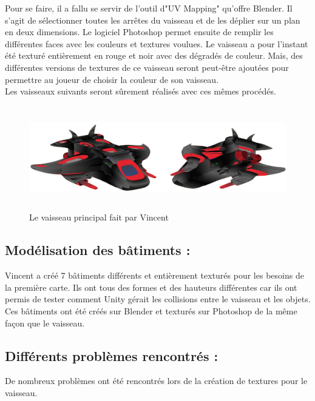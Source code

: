 \documentclass[10pt, titlepage]{report}
\begin{document}
Pour se faire, il a fallu se servir de l'outil d"UV Mapping" qu'offre Blender. Il s'agit de sélectionner toutes les arrêtes du vaisseau et de les déplier sur un plan en deux dimensions. Le logiciel Photoshop permet ensuite de remplir les différentes faces avec les couleurs et textures voulues. Le vaisseau a pour l'instant été texturé entièrement en rouge et noir avec des dégradés de couleur. Mais, des différentes versions de textures de ce vaisseau seront peut-être ajoutées pour permettre au joueur de choisir la couleur de son vaisseau.\\

Les vaisseaux suivants seront sûrement réalisés avec ces mêmes procédés.

\begin{figure}
\center
\includegraphics[height=4.5cm, width=15cm]{vaisseau_vincent.jpg}
\caption{Le vaisseau principal fait par Vincent}
\end{figure}
  
\subsection{Modélisation des bâtiments :}

Vincent a créé 7 bâtiments différents et entièrement texturés pour les besoins de la première carte. Ils ont tous des formes et des hauteurs différentes car ils ont permis de tester comment Unity gérait les collisions entre le vaisseau et les objets.\\

Ces bâtiments ont été créés sur Blender et texturés sur Photoshop de la même façon que le vaisseau.
  

\subsection{Différents problèmes rencontrés :}

De nombreux problèmes ont été rencontrés lors de la création de textures pour le vaisseau.\\
\end{document}

